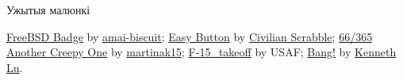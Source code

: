 \documentclass[ignorenonframetext,hyperref={pdftex,unicode}]{beamer}
\begin{document}
\begin{frame}{Ужытыя малюнкі}
	\begin{thebibliography}{10}
	\beamertemplatetextbibitems
	\bibitem{}
		{\sc \href{http://amai-biscuit.deviantart.com/art/FreeBSD-Badge-345132138}{FreeBSD Badge}} by {\sc \href{http://amai-biscuit.deviantart.com/}{amai-biscuit}};
	\bibitem{}
		{\sc \href{https://www.flickr.com/photos/nmcmanus/338391435}{Easy Button}} by {\sc \href{https://www.flickr.com/photos/nmcmanus/}{Civilian Scrabble}};
	\bibitem{}
		{\sc \href{https://www.flickr.com/photos/martinaphotography/6428406857}{66/365 Another Creepy One}} by {\sc \href{https://www.flickr.com/photos/martinaphotography/}{martinak15}};
		{\sc \href{https://commons.wikimedia.org/wiki/File:F-15\_takeoff.jpg}{F-15\_takeoff}} by {\sc USAF};
	\bibitem{}
		{\sc \href{https://www.flickr.com/photos/toasty/914441359}{Bang!}} by {\sc \href{https://www.flickr.com/photos/toasty/}{Kenneth Lu}}.
	\end{thebibliography}
\end{frame}
\end{document}
